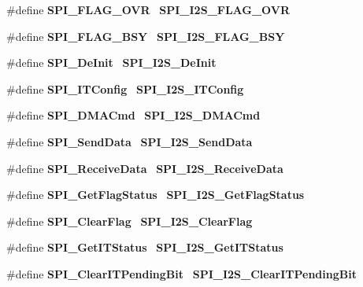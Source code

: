 \begin{DoxyCompactItemize}
$$\#define \textbf{ S\+P\+I\+\_\+\+F\+L\+A\+G\+\_\+\+O\+VR}~\textbf{ S\+P\+I\+\_\+\+I2\+S\+\_\+\+F\+L\+A\+G\+\_\+\+O\+VR}
\item 
\#define \textbf{ S\+P\+I\+\_\+\+F\+L\+A\+G\+\_\+\+B\+SY}~\textbf{ S\+P\+I\+\_\+\+I2\+S\+\_\+\+F\+L\+A\+G\+\_\+\+B\+SY}
\item 
\#define \textbf{ S\+P\+I\+\_\+\+De\+Init}~\textbf{ S\+P\+I\+\_\+\+I2\+S\+\_\+\+De\+Init}
\item 
\#define \textbf{ S\+P\+I\+\_\+\+I\+T\+Config}~\textbf{ S\+P\+I\+\_\+\+I2\+S\+\_\+\+I\+T\+Config}
\item 
\#define \textbf{ S\+P\+I\+\_\+\+D\+M\+A\+Cmd}~\textbf{ S\+P\+I\+\_\+\+I2\+S\+\_\+\+D\+M\+A\+Cmd}
\item 
\#define \textbf{ S\+P\+I\+\_\+\+Send\+Data}~\textbf{ S\+P\+I\+\_\+\+I2\+S\+\_\+\+Send\+Data}
\item 
\#define \textbf{ S\+P\+I\+\_\+\+Receive\+Data}~\textbf{ S\+P\+I\+\_\+\+I2\+S\+\_\+\+Receive\+Data}
\item 
\#define \textbf{ S\+P\+I\+\_\+\+Get\+Flag\+Status}~\textbf{ S\+P\+I\+\_\+\+I2\+S\+\_\+\+Get\+Flag\+Status}
\item 
\#define \textbf{ S\+P\+I\+\_\+\+Clear\+Flag}~\textbf{ S\+P\+I\+\_\+\+I2\+S\+\_\+\+Clear\+Flag}
\item 
\#define \textbf{ S\+P\+I\+\_\+\+Get\+I\+T\+Status}~\textbf{ S\+P\+I\+\_\+\+I2\+S\+\_\+\+Get\+I\+T\+Status}
\item 
\#define \textbf{ S\+P\+I\+\_\+\+Clear\+I\+T\+Pending\+Bit}~\textbf{ S\+P\+I\+\_\+\+I2\+S\+\_\+\+Clear\+I\+T\+Pending\+Bit}
\end{DoxyCompactItemize}
